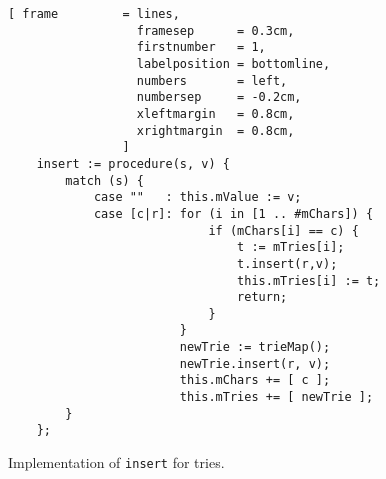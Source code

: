 \begin{figure}[!ht]
\centering
\begin{Verbatim}[ frame         = lines, 
                  framesep      = 0.3cm, 
                  firstnumber   = 1,
                  labelposition = bottomline,
                  numbers       = left,
                  numbersep     = -0.2cm,
                  xleftmargin   = 0.8cm,
                  xrightmargin  = 0.8cm,
                ]
    insert := procedure(s, v) {
        match (s) {
            case ""   : this.mValue := v;
            case [c|r]: for (i in [1 .. #mChars]) {
                            if (mChars[i] == c) {
                                t := mTries[i];
                                t.insert(r,v);
                                this.mTries[i] := t;
                                return;
                            }
                        }
                        newTrie := trieMap();
                        newTrie.insert(r, v);
                        this.mChars += [ c ]; 
                        this.mTries += [ newTrie ];
        } 
    };
\end{Verbatim}
\vspace*{-0.3cm}
\caption{Implementation of \texttt{insert} for tries.}
\label{fig:trie.stlx-insert}
\end{figure}


